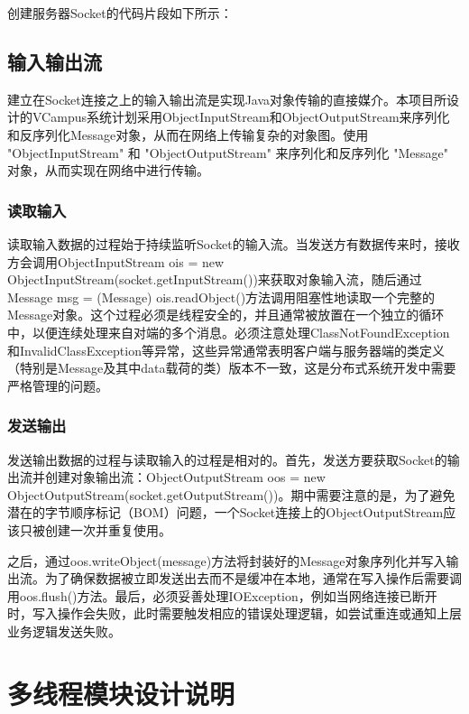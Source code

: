 \documentclass[a4paper]{ctexart}
\begin{document}
创建服务器Socket的代码片段如下所示：
\begin{comment}
\begin{lstlisting}
// 创建服务器Socket
serverSocket = new ServerSocket(IConstant.SERVER_PORT);
\end{lstlisting}
\end{comment}

\subsection{输入输出流}
建立在Socket连接之上的输入输出流是实现Java对象传输的直接媒介。本项目所设计的VCampus系统计划采用ObjectInputStream和ObjectOutputStream来序列化和反序列化Message对象，从而在网络上传输复杂的对象图。使用 "ObjectInputStream" 和 "ObjectOutputStream" 来序列化和反序列化 "Message" 对象，从而实现在网络中进行传输。

\subsubsection{读取输入}
读取输入数据的过程始于持续监听Socket的输入流。当发送方有数据传来时，接收方会调用ObjectInputStream ois = new ObjectInputStream(socket.getInputStream())来获取对象输入流，随后通过Message msg = (Message) ois.readObject()方法调用阻塞性地读取一个完整的Message对象。这个过程必须是线程安全的，并且通常被放置在一个独立的循环中，以便连续处理来自对端的多个消息。必须注意处理ClassNotFoundException和InvalidClassException等异常，这些异常通常表明客户端与服务器端的类定义（特别是Message及其中data载荷的类）版本不一致，这是分布式系统开发中需要严格管理的问题。

\subsubsection{发送输出}
发送输出数据的过程与读取输入的过程是相对的。首先，发送方要获取Socket的输出流并创建对象输出流：ObjectOutputStream oos = new ObjectOutputStream(socket.getOutputStream())。期中需要注意的是，为了避免潜在的字节顺序标记（BOM）问题，一个Socket连接上的ObjectOutputStream应该只被创建一次并重复使用。

之后，通过oos.writeObject(message)方法将封装好的Message对象序列化并写入输出流。为了确保数据被立即发送出去而不是缓冲在本地，通常在写入操作后需要调用oos.flush()方法。最后，必须妥善处理IOException，例如当网络连接已断开时，写入操作会失败，此时需要触发相应的错误处理逻辑，如尝试重连或通知上层业务逻辑发送失败。

\section{多线程模块设计说明}
\end{document}

